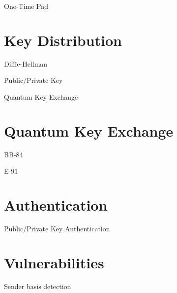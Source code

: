 \documentclass{beamer}
\begin{document}
	\begin{frame}{One-Time Pad} %

	\end{frame}

	\section{Key Distribution}

	\begin{frame}{Diffie-Hellman} %

	\end{frame}

	\begin{frame}{Public/Private Key} %

	\end{frame}

	\begin{frame}{Quantum Key Exchange} %

	\end{frame}

	\section{Quantum Key Exchange}

	\begin{frame}{BB-84} %

	\end{frame}

	\begin{frame}{E-91} %

	\end{frame}

	\section{Authentication}

	\begin{frame}{Public/Private Key Authentication} %

	\end{frame}

	\section{Vulnerabilities}

	\begin{frame}{Sender basis detection} %

	\end{frame}


	\begin{frame}[plain]\end{frame}
\end{document}
